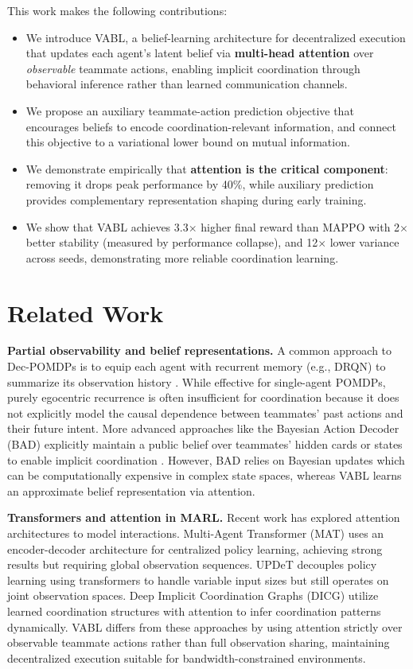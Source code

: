 \documentclass{article}
\theoremstyle{plain}
\theoremstyle{definition}
\theoremstyle{remark}
\begin{document}
This work makes the following contributions:
\begin{itemize}
  \item We introduce VABL, a belief-learning architecture for decentralized execution that updates each agent's latent belief via \textbf{multi-head attention} over \emph{observable} teammate actions, enabling implicit coordination through behavioral inference rather than learned communication channels.
  \item We propose an auxiliary teammate-action prediction objective that encourages beliefs to encode coordination-relevant information, and connect this objective to a variational lower bound on mutual information.
  \item We demonstrate empirically that \textbf{attention is the critical component}: removing it drops peak performance by 40\%, while auxiliary prediction provides complementary representation shaping during early training.
  \item We show that VABL achieves 3.3$\times$ higher final reward than MAPPO with 2$\times$ better stability (measured by performance collapse), and 12$\times$ lower variance across seeds, demonstrating more reliable coordination learning.
\end{itemize}

\section{Related Work}

\textbf{Partial observability and belief representations.}
A common approach to Dec-POMDPs is to equip each agent with recurrent memory (e.g., DRQN) to summarize its observation history \cite{hausknecht2015deep}. While effective for single-agent POMDPs, purely egocentric recurrence is often insufficient for coordination because it does not explicitly model the causal dependence between teammates' past actions and their future intent. More advanced approaches like the Bayesian Action Decoder (BAD) explicitly maintain a public belief over teammates' hidden cards or states to enable implicit coordination \cite{foerster2019bad}. However, BAD relies on Bayesian updates which can be computationally expensive in complex state spaces, whereas VABL learns an approximate belief representation via attention.

\textbf{Transformers and attention in MARL.}
Recent work has explored attention architectures to model interactions. Multi-Agent Transformer (MAT) \cite{wen2022mat} uses an encoder-decoder architecture for centralized policy learning, achieving strong results but requiring global observation sequences. UPDeT \cite{hu2021updet} decouples policy learning using transformers to handle variable input sizes but still operates on joint observation spaces. Deep Implicit Coordination Graphs (DICG) \cite{li2020deep} utilize learned coordination structures with attention to infer coordination patterns dynamically. VABL differs from these approaches by using attention strictly over observable teammate actions rather than full observation sharing, maintaining decentralized execution suitable for bandwidth-constrained environments.
\end{document}
